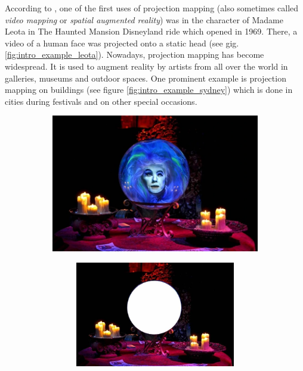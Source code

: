 According to \citet*{WikiHauntedMansion}, one of the first uses of projection mapping (also sometimes called \textit{video mapping} or \textit{spatial augmented reality}) was in the character of Madame Leota in The Haunted Mansion Disneyland ride which opened in 1969. There, a video of a human face was projected onto a static head (see gig. \ref{fig:intro_example_leota}). Nowadays, projection mapping has become widespread. It is used to augment reality by artists from all over the world in galleries, museums and outdoor spaces. One prominent example is projection mapping on buildings (see figure \ref{fig:intro_example_sydney}) which is done in cities during festivals and on other special occasions.

\begin{figure}[ht]
    \centering
    \begin{subfigure}{0.6\textwidth}
        \centering
        \includegraphics[width=\textwidth]{images/01-Leota.jpg}
        \caption{}
        \label{fig:intro_example_leota-full}
    \end{subfigure}
    \hfill
    \begin{subfigure}{0.39\textwidth}
        \centering
        \begin{subfigure}{\textwidth}
            \centering
            \includegraphics[width=\textwidth]{images/01-Leota-no_head.jpg}
            \caption{}
            \label{fig:intro_example_leota-scene}
        \end{subfigure}
        

\end{subfigure}
\end{figure}
